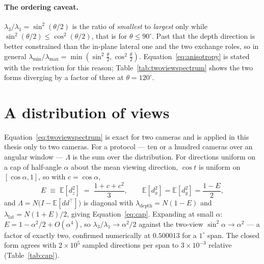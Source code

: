 \paragraph{The ordering caveat.} $\lambda_3/\lambda_1 = \sin^2(\theta/2)$ is the
ratio of \emph{smallest} to \emph{largest} only while
$\sin^2(\theta/2) \le \cos^2(\theta/2)$, that is for $\theta \le 90^\circ$. Past
that the depth direction is better constrained than the in-plane lateral one and
the two exchange roles, so in general
$\lambda_{\min}/\lambda_{\max} = \min(\sin^2\tfrac\theta2, \cos^2\tfrac\theta2)$.
Equation~\eqref{eq:anisotropy} is stated with the restriction for this reason;
Table~\ref{tab:twoviewspectrum} shows the two forms diverging by a factor of
three at $\theta = 120^\circ$.

\section{A distribution of views}
\label{app:cap}
Equation~\eqref{eq:twoviewspectrum} is exact for two cameras and is applied in
this thesis only to two cameras. For a protocol --- ten or a hundred cameras over
an angular window --- $\Lambda$ is the sum over the distribution. For directions
uniform on a cap of half-angle $\alpha$ about the mean viewing direction,
$\cos t$ is uniform on $[\cos\alpha, 1]$, so with $c = \cos\alpha$,
\begin{equation}
  E \;\equiv\; \mathbb{E}[d_z^2] \;=\; \frac{1+c+c^2}{3},
  \qquad
  \mathbb{E}[d_x^2] = \mathbb{E}[d_y^2] = \frac{1-E}{2},
\end{equation}
and $\Lambda = N\big(I - \mathbb{E}[dd^{\!\top}]\big)$ is diagonal with
$\lambda_{\mathrm{depth}} = N(1-E)$ and $\lambda_{\mathrm{lat}} = N(1+E)/2$,
giving Equation~\eqref{eq:cap}. Expanding at small $\alpha$: $E = 1 -
\alpha^2/2 + O(\alpha^4)$, so $\lambda_3/\lambda_1 \to \alpha^2/2$ against the
two-view $\sin^2\alpha \to \alpha^2$ --- a factor of exactly two, confirmed
numerically at $0.500013$ for a $1^\circ$ span. The closed form agrees with
$2\times10^5$ sampled directions per span to $3\times10^{-3}$ relative
(Table~\ref{tab:cap}).

